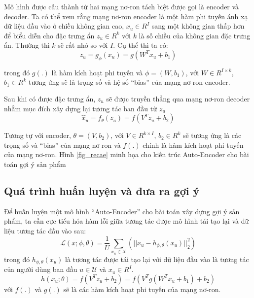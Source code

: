     Mô hình được cấu thành từ hai mạng nơ-ron tách biệt được gọi là encoder và decoder. 
    Ta có thể xem rằng mạng nơ-ron encoder là một hàm phi tuyến ánh xạ dữ liệu đầu vào ở chiều không gian cao, $x_u \in R^I$ sang một không gian thấp hơn để biểu diễn cho đặc trưng ẩn $z_u \in R^k$ với $k$ là số chiều của không gian đặc trưng ẩn. 
    Thường thì $k$ sẽ rất nhỏ so với $I$. Cụ thể thì ta có:
    \begin{equation}
        z_u = g_\phi(x_u) = g(W^T x_u + b_1)
    \end{equation}

  
    trong đó $g(.)$ là hàm kích hoạt phi tuyến và $\phi = (W,b_1)$, với $W\in R^{I\times k}$, $b_1 \in R^{k}$ tương ứng sẽ là trọng số và hệ số ``bias'' của mạng nơ-ron encoder. 

    Sau khi có được đặc trưng ẩn, $z_u$ sẽ được truyền thẳng qua mạng nơ-ron decoder nhằm mục đích xây dựng lại tương tác ban đầu từ $z_u$
    \begin{equation}
        \widehat{x}_u = f_\theta(z_u) = f(V^T z_u + b_2)
    \end{equation}

    Tương tự với encoder, $\theta = (V,b_2)$, với $V\in R^{k\times I}$, $b_2 \in R^{k}$  sẽ tương ứng là các trọng số và ``bias'' của mạng nơ ron và $f(.)$ chính là hàm kích hoạt phi tuyến của mạng nơ-ron.
    Hình \ref{fig_recae} minh họa cho kiến trúc Auto-Encoder cho bài toán gợi ý sản phẩm

    \subsection{Quá trình huấn luyện và đưa ra gợi ý}
    
    Để huấn luyện một mô hình ``Auto-Encoder'' cho bài toán xây dựng gợi ý sản phẩm, ta cần cực tiểu hóa hàm lỗi giữa tương tác được mô hình tái tạo lại và dữ liệu tương tác đầu vào sau:
    \begin{equation}
        \label{ae_rec_loss}
        \mathcal{L}(x;\phi,\theta) = \frac {1}{U}\sum_{x_u \in X}(||x_u - h_{\phi,\theta}(x_u)||^2_2)
    \end{equation}
    trong đó $h_{\phi,\theta}(x_u)$ là tương tác được tái tạo lại với dữ liệu đầu vào là tương tác của người dùng ban đầu $u \in \mathcal{U}$ và $x_u \in R^I$.
    \begin{equation}
        h(x_u;\theta) = f(V^T z_u+ b_2) = f(V^T g(W^T x_u + b_1) + b_2)
    \end{equation}    
    với $f(.)$ và $g(.)$ sẽ là các hàm kích hoạt phi tuyến của mạng nơ-ron.
    
